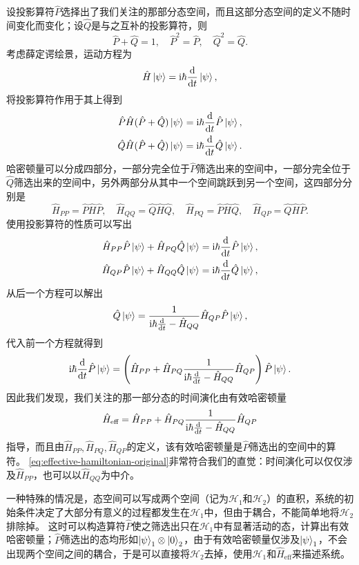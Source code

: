 \documentclass[UTF8, a4paper]{ctexart}
\newcommand*{\ii}{\mathrm{i}}
\begin{document}
设投影算符$\hat{P}$选择出了我们关注的那部分态空间，而且这部分态空间的定义不随时间变化而变化；设$\hat{Q}$是与之互补的投影算符，则
\[
    \hat{P} + \hat{Q} = 1, \quad \hat{P}^2 = \hat{P}, \quad \hat{Q}^2 = \hat{Q}.
\]
考虑薛定谔绘景，运动方程为
\[
    \hat{H} \ket{\psi} = \ii \hbar \dv{t} \ket{\psi},
\]
将投影算符作用于其上得到
\[
    \begin{aligned}
        \hat{P} \hat{H}(\hat{P}+\hat{Q}) \ket{\psi} = \ii \hbar \dv{t} \hat{P} \ket{\psi}, \\
        \hat{Q} \hat{H}(\hat{P}+\hat{Q}) \ket{\psi} = \ii \hbar \dv{t} \hat{Q} \ket{\psi}.
    \end{aligned}
\]
哈密顿量可以分成四部分，一部分完全位于$\hat{P}$筛选出来的空间中，一部分完全位于$\hat{Q}$筛选出来的空间中，另外两部分从其中一个空间跳跃到另一个空间，这四部分分别是
\[
    \hat{H}_{PP} = \hat{P} \hat{H} \hat{P}, \quad \hat{H}_{QQ} = \hat{Q} \hat{H} \hat{Q}, \quad \hat{H}_{PQ} = \hat{P} \hat{H} \hat{Q}, \quad \hat{H}_{QP} = \hat{Q} \hat{H} \hat{P}.
\]
使用投影算符的性质可以写出
\[
    \begin{aligned}
        \hat{H}_{PP} \hat{P} \ket{\psi} + \hat{H}_{PQ} \hat{Q} \ket{\psi} = \ii \hbar \dv{t} \hat{P} \ket{\psi}, \\
        \hat{H}_{QP} \hat{P} \ket{\psi} + \hat{H}_{QQ} \hat{Q} \ket{\psi} = \ii \hbar \dv{t} \hat{Q} \ket{\psi},
    \end{aligned}
\]
从后一个方程可以解出
\[
    \hat{Q} \ket{\psi} = \frac{1}{\ii \hbar \dv{t} - \hat{H}_{QQ}} \hat{H}_{QP} \hat{P} \ket{\psi},
\]
代入前一个方程就得到
\[
    \ii \hbar \dv{t} \hat{P} \ket{\psi} = \left(\hat{H}_{PP} + \hat{H}_{PQ} \frac{1}{\ii \hbar \dv{t} - \hat{H}_{QQ}} \hat{H}_{QP}\right) \hat{P} \ket{\psi}.
\]
因此我们发现，我们关注的那一部分态的时间演化由有效哈密顿量
\begin{equation}
    \hat{H}_\text{eff} = \hat{H}_{PP} + \hat{H}_{PQ} \frac{1}{\ii \hbar \dv{t} - \hat{H}_{QQ}} \hat{H}_{QP}
    \label{eq:effective-hamiltonian-original}
\end{equation}
指导，而且由$\hat{H}_{PP}, \hat{H}_{PQ}, \hat{H}_{QP}$的定义，该有效哈密顿量是$\hat{P}$筛选出的空间中的算符。
\eqref{eq:effective-hamiltonian-original}非常符合我们的直觉：时间演化可以仅仅涉及$\hat{H}_{PP}$，也可以以$\hat{H}_{QQ}$为中介。

一种特殊的情况是，态空间可以写成两个空间（记为$\mathcal{H}_1$和$\mathcal{H}_2$）的直积，系统的初始条件决定了大部分有意义的过程都发生在$\mathcal{H}_1$中，但由于耦合，不能简单地将$\mathcal{H}_2$排除掉。
这时可以构造算符$\hat{P}$使之筛选出只在$\mathcal{H}_1$中有显著活动的态，计算出有效哈密顿量；$\hat{P}$筛选出的态均形如$\ket{\psi}_1 \otimes \ket{0}_2$，由于有效哈密顿量仅涉及$\ket{\psi}_1$，不会出现两个空间之间的耦合，于是可以直接将$\mathcal{H}_2$去掉，使用$\mathcal{H}_1$和$\hat{H}_\text{eff}$来描述系统。
\end{document}

